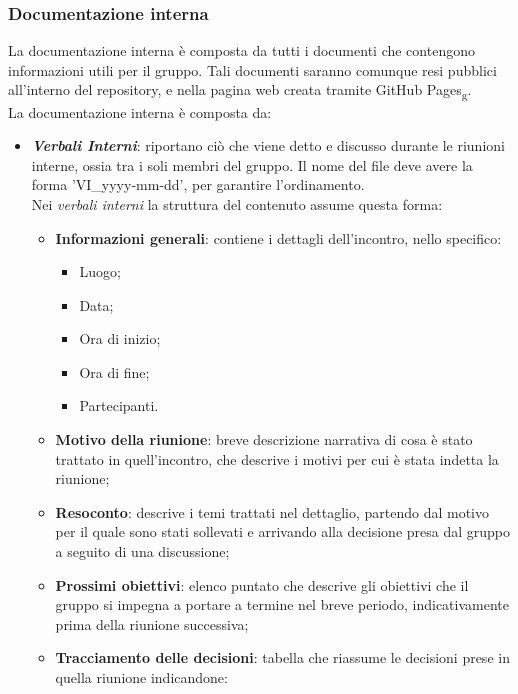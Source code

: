 \subsubsection{Documentazione interna}
La documentazione interna è composta da tutti i documenti che contengono
informazioni utili per il gruppo. Tali documenti saranno comunque resi pubblici
all'interno del repository, e nella pagina web creata tramite GitHub
Pages\textsubscript{g}.\\ La documentazione interna è composta da:
\begin{itemize}
      \item \textit{\textbf{Verbali Interni}}: riportano ciò che viene detto e discusso durante le riunioni interne, ossia tra i soli membri del gruppo.
            Il nome del file deve avere la forma 'VI\_yyyy-mm-dd', per garantire l'ordinamento.
            \\Nei \textit{verbali interni} la struttura del contenuto assume questa forma:
            \begin{itemize}
                  \item \textbf{Informazioni generali}: contiene i dettagli dell'incontro, nello specifico:
                        \begin{itemize}
                              \item Luogo;
                              \item Data;
                              \item Ora di inizio;
                              \item Ora di fine;
                              \item Partecipanti.
                        \end{itemize}
                  \item \textbf{Motivo della riunione}: breve descrizione narrativa di cosa è stato trattato in quell'incontro, che descrive i motivi per cui è stata indetta la riunione;
                  \item \textbf{Resoconto}: descrive i temi trattati nel dettaglio, partendo dal motivo per il quale sono stati sollevati e arrivando alla decisione presa dal gruppo a seguito di una discussione;
                  \item \textbf{Prossimi obiettivi}: elenco puntato che descrive gli obiettivi che il gruppo si impegna a portare a termine nel breve periodo, indicativamente prima della riunione successiva;
                  \item \textbf{Tracciamento delle decisioni}: tabella che riassume le decisioni prese in quella riunione indicandone:

\end{itemize}
\end{itemize}
